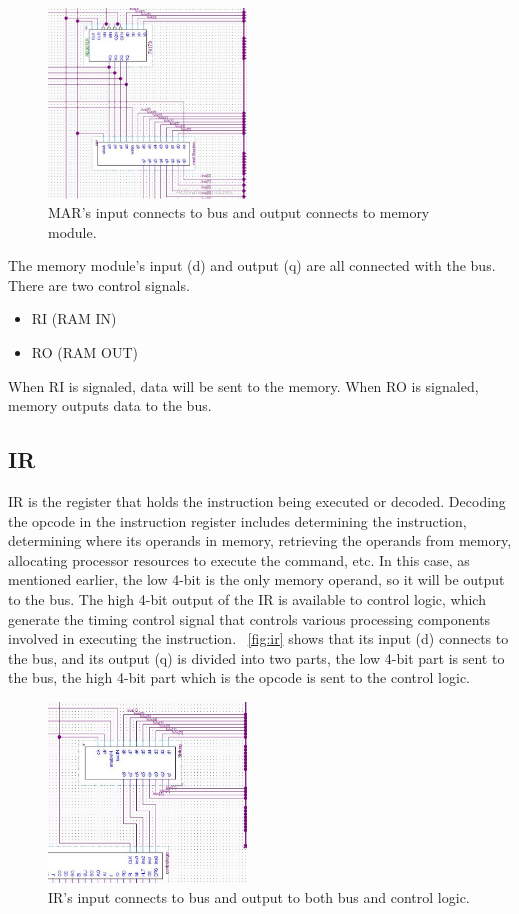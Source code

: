 \begin{figure}[th]
	\includegraphics[width=0.47\textwidth]{figures/marmem}
	\centering
	\caption{MAR's input connects to bus and output connects to memory module.}
	\label{fig:marmem}
\end{figure}

The memory module's input (d) and output (q) are all connected with the bus. There are two control signals.

\begin{itemize}
	\item RI (RAM IN)
	\item RO (RAM OUT)
\end{itemize}

When RI is signaled, data will be sent to the memory. When RO is signaled, memory outputs data to the bus.


\subsection{IR}
IR is the register that holds the instruction being executed or decoded. Decoding the opcode in the instruction register includes determining the instruction, determining where its operands in memory, retrieving the operands from memory, allocating processor resources to execute the command, etc. In this case, as mentioned earlier, the low 4-bit is the only memory operand, so it will be output to the bus. The high 4-bit output of the IR is available to control logic, which generate the timing control signal that controls various processing components involved in executing the instruction. ~\autoref{fig:ir} shows that its input (d) connects to the bus, and its output (q) is divided into two parts, the low 4-bit part is sent to the bus, the high 4-bit part which is the opcode is sent to the control logic.

\begin{figure}[th]
	\includegraphics[width=0.47\textwidth]{figures/ir}
	\centering
	\caption{IR's input connects to bus and output to both bus and control logic.}
	\label{fig:ir}
\end{figure}

